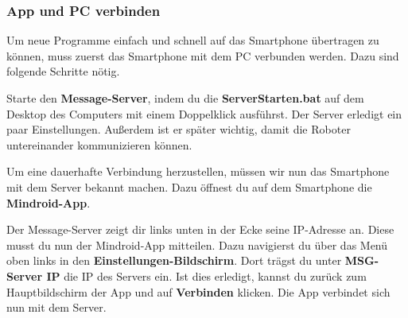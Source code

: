\documentclass[
	12pt,
	article,
	type=bsc, %
	colorbacktitle,
	instlogo,
	accentcolor=tud1c,
	german,
	twoside
]{tudexercise}
\begin{document}
\subsubsection{App und PC verbinden}
Um neue Programme einfach und schnell auf das Smartphone übertragen zu können, muss zuerst das Smartphone mit dem PC verbunden werden. Dazu sind folgende Schritte nötig.
\begin{enumerate}
\begin{minipage}{.5\textwidth}

\item Starte den \textbf{Message-Server}, indem du die \textbf{ServerStarten.bat} auf dem Desktop des Computers mit einem Doppelklick ausführst. Der Server erledigt ein paar Einstellungen. Außerdem ist er später wichtig, damit die Roboter untereinander kommunizieren können.
 
\item Um eine dauerhafte Verbindung herzustellen, müssen wir nun das Smartphone mit dem Server bekannt machen. Dazu öffnest du auf dem Smartphone die \textbf{Mindroid-App}. 

\item Der Message-Server zeigt dir links unten in der Ecke seine IP-Adresse an. Diese musst du nun der Mindroid-App mitteilen. Dazu navigierst du über das Menü oben links in den \textbf{Einstellungen-Bildschirm}. Dort trägst du unter \textbf{MSG-Server IP} die IP des Servers ein. Ist dies erledigt, kannst du zurück zum Hauptbildschirm der App und auf \textbf{Verbinden} klicken. Die App verbindet sich nun mit dem Server.

\end{minipage}	
\begin{minipage}{.5\textwidth}


\end{minipage}
\end{enumerate}
\end{document}
